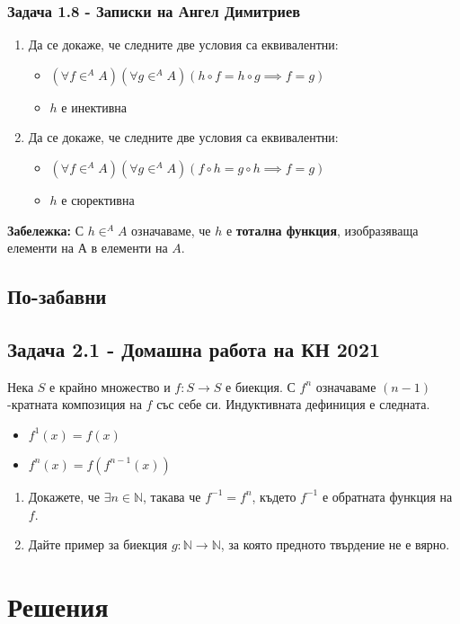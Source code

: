 \documentclass[12pt]{article}
\begin{document}
\subsubsection*{Задача 1.8 - Записки на Ангел Димитриев}
\begin{enumerate}[label=\Alph*)]
    \item Да се докаже, че следните две условия са еквивалентни:
    \begin{itemize}
        \item $(\forall f \in^{A} A)(\forall g \in^{A} A)(h \circ f = h \circ g \implies f = g)$
        \item $h$ е инективна
    \end{itemize}
    \item Да се докаже, че следните две условия са еквивалентни:
    \begin{itemize}
        \item $(\forall f \in^{A} A)(\forall g \in^{A} A)(f \circ h = g \circ h \implies f = g)$
        \item $h$ е сюрективна
    \end{itemize}
\end{enumerate}
\textbf{Забележка:} С $h \in^{A} A$ означаваме, че $h$ е \textbf{тотална функция}, изобразяваща елементи на $А$ в елементи на $A$.

\subsection*{По-забавни}
\subsection*{Задача 2.1 - Домашна работа на КН 2021}
Нека $S$ е крайно множество и $f: S \rightarrow S$ е биекция. С $f^n$ означаваме $(n-1)$-кратната композиция на $f$ със себе си. Индуктивната дефиниция е следната.
\begin{itemize}
    \item $f^1(x) = f(x)$
    \item $f^n(x) = f(f^{n-1}(x))$
\end{itemize}    

\begin{enumerate}[label=\Alph*)]
    \item Докажете, че $\exists n \in \mathbb{N}$, такава че $f^{-1} = f^n$, където $f^{-1}$ е обратната функция на $f$.
    \item Дайте пример за биекция $g: \mathbb{N} \rightarrow \mathbb{N}$, за която предното твърдение не е вярно. 
\end{enumerate}

\section*{Решения}
\end{document}
